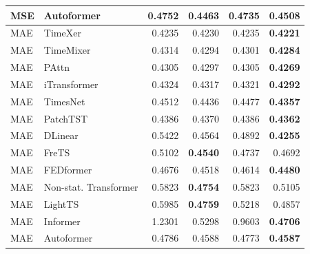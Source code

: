\begin{longtable}{llrrrr}
MSE & Autoformer & 0.4752 & \textbf{0.4463} & 0.4735 & 0.4508 \\
\midrule
MAE & TimeXer & 0.4235 & 0.4230 & 0.4235 & \textbf{0.4221} \\
MAE & TimeMixer & 0.4314 & 0.4294 & 0.4301 & \textbf{0.4284} \\
MAE & PAttn & 0.4305 & 0.4297 & 0.4305 & \textbf{0.4269} \\
MAE & iTransformer & 0.4324 & 0.4317 & 0.4321 & \textbf{0.4292} \\
MAE & TimesNet & 0.4512 & 0.4436 & 0.4477 & \textbf{0.4357} \\
MAE & PatchTST & 0.4386 & 0.4370 & 0.4386 & \textbf{0.4362} \\
MAE & DLinear & 0.5422 & 0.4564 & 0.4892 & \textbf{0.4255} \\
MAE & FreTS & 0.5102 & \textbf{0.4540} & 0.4737 & 0.4692 \\
MAE & FEDformer & 0.4676 & 0.4518 & 0.4614 & \textbf{0.4480} \\
MAE & Non-stat. Transformer & 0.5823 & \textbf{0.4754} & 0.5823 & 0.5105 \\
MAE & LightTS & 0.5985 & \textbf{0.4759} & 0.5218 & 0.4857 \\
MAE & Informer & 1.2301 & 0.5298 & 0.9603 & \textbf{0.4706} \\
MAE & Autoformer & 0.4786 & 0.4588 & 0.4773 & \textbf{0.4587} \\
\end{longtable}
\endgroup

